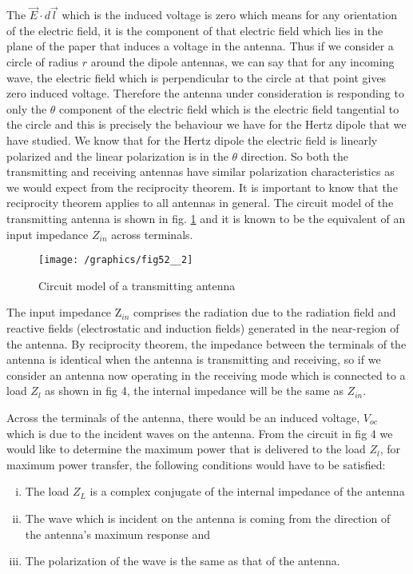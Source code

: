 The $\vec{E}\cdot d\vec{l}$ which is the induced voltage is zero which means for any orientation of the electric field, it is the component of that electric field which lies in the plane of the paper that induces a voltage in the antenna. Thus if we consider a circle of radius $r$ around the dipole antennas, we can say that for any incoming wave, the electric field which is perpendicular to the circle at that point gives zero induced voltage. Therefore the antenna under consideration is responding to only the $\theta$ component of the electric field which is the electric field tangential to the circle and this is precisely the behaviour we have for the Hertz dipole that we have studied. We know that for the Hertz dipole the electric field is linearly polarized and the linear polarization is in the $\theta$ direction. So both the transmitting and receiving antennas have similar polarization characteristics as we would expect from the reciprocity theorem. It is important to know that the reciprocity theorem applies to all antennas in general. The circuit model of the transmitting antenna is shown in fig. \ref{49.3} and it is known to be the equivalent of an input impedance $Z_{in}$ across terminals.
\begin{figure}[h]
\centering
\texttt{[image: /graphics/fig52\_\_2]}
\caption{Circuit model of a transmitting antenna}
\label{49.3}
\end{figure}

The input impedance Z$_{in}$  comprises the radiation due to the radiation field and reactive fields (electrostatic and induction fields) generated in the near-region of the antenna.
By reciprocity theorem, the impedance between the terminals of the antenna is identical when the antenna is transmitting and receiving, so if we consider an antenna now operating in the receiving mode which is connected to a load $Z_{l}$ as shown in fig 4, the internal impedance will be the same as $Z_{in}$.

Across the terminals of the antenna, there would be an induced voltage, $V_{oc}$ which is due to the incident waves on the antenna. From the circuit in fig 4 we would like to determine the maximum power that is delivered to the load $Z_{l}$, for maximum power transfer, the following conditions would have to be satisfied:
\begin{enumerate}[(i)]
\item The load $Z_{L}$ is a complex conjugate of the internal impedance of the antenna
\item The wave which is incident on the antenna is coming from the direction of the antenna's maximum response and
\item The polarization of the wave is the same as that of the antenna.
\end{enumerate}

